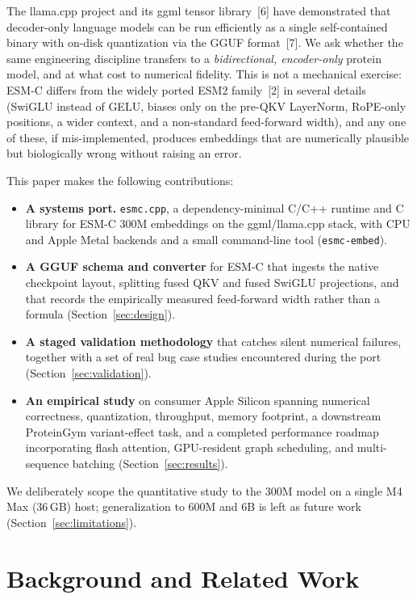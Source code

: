 \documentclass{article}
\begin{document}
The llama.cpp project and its ggml tensor library~[6] have demonstrated that decoder-only language models can be run efficiently as a single self-contained binary with on-disk quantization via the GGUF format~[7]. We ask whether the same engineering discipline transfers to a \emph{bidirectional, encoder-only} protein model, and at what cost to numerical fidelity. This is not a mechanical exercise: ESM-C differs from the widely ported ESM2 family~[2] in several details (SwiGLU instead of GELU, biases only on the pre-QKV LayerNorm, RoPE-only positions, a wider context, and a non-standard feed-forward width), and any one of these, if mis-implemented, produces embeddings that are numerically plausible but biologically wrong without raising an error.

This paper makes the following contributions:
\begin{itemize}
  \item \textbf{A systems port.} \texttt{esmc.cpp}, a dependency-minimal C/C++ runtime and C library for ESM-C 300M embeddings on the ggml/llama.cpp stack, with CPU and Apple Metal backends and a small command-line tool (\texttt{esmc-embed}).
  \item \textbf{A GGUF schema and converter} for ESM-C that ingests the native checkpoint layout, splitting fused QKV and fused SwiGLU projections, and that records the empirically measured feed-forward width rather than a formula (Section~\ref{sec:design}).
  \item \textbf{A staged validation methodology} that catches silent numerical failures, together with a set of real bug case studies encountered during the port (Section~\ref{sec:validation}).
  \item \textbf{An empirical study} on consumer Apple Silicon spanning numerical correctness, quantization, throughput, memory footprint, a downstream ProteinGym variant-effect task, and a completed performance roadmap incorporating flash attention, GPU-resident graph scheduling, and multi-sequence batching (Section~\ref{sec:results}).
\end{itemize}

We deliberately scope the quantitative study to the 300M model on a single M4 Max (36\,GB) host; generalization to 600M and 6B is left as future work (Section~\ref{sec:limitations}).

\section{Background and Related Work}
\label{sec:background}
\end{document}
